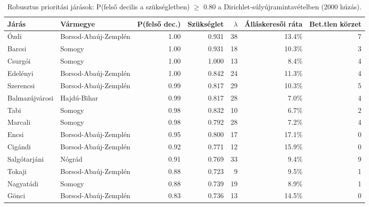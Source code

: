 \begin{table}[htbp]
\centering
\small
\caption{Robusztus prioritási járások: P(felső decilis a szükségletben) $\ge$ 0.80 a Dirichlet‑súlyújramintavételben (2000 húzás).}
\label{tab:robust}
\begin{tabular}{llrrrrr}
\toprule
Járás & Vármegye & P(felső dec.) & Szükséglet & $\lambda$ & Álláskeresői ráta & Bet.tlen körzet \\
\midrule
Ózdi & Borsod-Abaúj-Zemplén & 1.00 & 0.931 & 38 & 13.4\% & 7 \\
Barcsi & Somogy & 1.00 & 0.931 & 18 & 10.3\% & 3 \\
Csurgói & Somogy & 1.00 & 1.000 & 13 & 8.4\% & 4 \\
Edelényi & Borsod-Abaúj-Zemplén & 1.00 & 0.842 & 24 & 11.3\% & 4 \\
Szerencsi & Borsod-Abaúj-Zemplén & 0.99 & 0.817 & 29 & 10.3\% & 5 \\
Balmazújvárosi & Hajdú-Bihar & 0.99 & 0.817 & 28 & 7.0\% & 4 \\
Tabi & Somogy & 0.98 & 0.832 & 10 & 6.7\% & 2 \\
Marcali & Somogy & 0.98 & 0.792 & 28 & 7.2\% & 4 \\
Encsi & Borsod-Abaúj-Zemplén & 0.95 & 0.800 & 17 & 17.1\% & 0 \\
Cigándi & Borsod-Abaúj-Zemplén & 0.92 & 0.771 & 12 & 15.9\% & 0 \\
Salgótarjáni & Nógrád & 0.91 & 0.769 & 33 & 9.4\% & 9 \\
Tokaji & Borsod-Abaúj-Zemplén & 0.88 & 0.723 & 9 & 9.5\% & 1 \\
Nagyatádi & Somogy & 0.88 & 0.739 & 19 & 8.9\% & 1 \\
Gönci & Borsod-Abaúj-Zemplén & 0.83 & 0.736 & 13 & 14.5\% & 0 \\
\bottomrule
\end{tabular}
\end{table}

